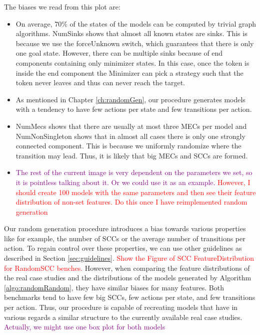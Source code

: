 The biases we read from this plot are:
\begin{itemize}
    \item On average, 70\% of the states of the models can be computed by trivial graph algorithms. NumSinks shows that almost all known states are sinks.
            This is because we use the forceUnknown switch, which guarantees that there is only one goal state. 
            However, there can be multiple sinks because of end components containing only minimizer states. 
            In this case, once the token is inside the end component the Minimizer can pick a strategy such that the token never leaves and thus can never reach the target.
    \item As mentioned in Chapter \ref{ch:randomGen}, our procedure generates models with a tendency to have few actions per state and few transitions per action.
    \item NumMecs shows that there are usually at most three MECs per model
    and NumNonSingleton shows that in almost all cases there is only one strongly connected component.
        This is because we uniformly randomize where the transition may lead. Thus, it is likely that big MECs and SCCs are formed. 
    \item \textcolor{purple}{The rest of the current image is very dependent on the parameters we set, so it is pointless talking about it.
          Or we could use it as an example.}
          \textcolor{red}{However, I should create 100 models with the same parameters and then see their feature distribution of non-set features. Do this once I have reimplemented random generation}
\end{itemize}

Our random generation procedure introduces a bias towards various properties like for example, the number of SCCs or the average number of transitions per action. 
To regain control over these properties, we can use other guidelines as described in Section \ref{sec:guidelines}.
\textcolor{red}{Show the Figure of SCC FeatureDistribution for RandomSCC benches.}
However, when comparing the feature distributions of the real case studies and the distributions of the models generated by Algorithm \ref{algo:randomRandom},
they have similar biases for many features. Both benchmarks tend to have few big SCCs, few actions per state, and few transitions per action.
Thus, our procedure is capable of recreating models that have in various regards a similar structure to the currently available real case studies. 
\textcolor{purple}{Actually, we might use one box plot for both models}

